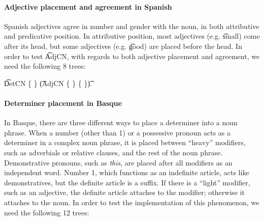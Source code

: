 

\paragraph{Adjective placement and agreement in Spanish}
Spanish adjectives agree in number and gender with the noun, in both
attributive and predicative position. In attributive position, most
adjectives (e.g. \t{small}) come after its head, but some adjectives
(e.g. \t{good}) are placed before the head. 
In order to test \t{AdjCN}, with regards to both adjective placement
and agreement, we need the following 8 trees: 
\begin{EmptyItem}
\t{DetCN} \; \{  \} \;
 \t{(AdjCN} \; \{  \} 
           \{  \}\t{)}.
\end{EmptyItem}

\paragraph{Determiner placement in Basque} In Basque, there are three
different ways to place a determiner into a noun phrase. When a number
(other than 1) or a possessive pronoun acts as a determiner in a
complex noun phrase, it is placed between ``heavy'' modifiers, such as
adverbials or relative clauses, and the rest of the noun phrase. 
Demonstrative pronouns, such as \emph{this}, are placed after
all modifiers as an independent word. Number 1, which functions as an
indefinite article, acts like demonstratives, but the definite article
is a suffix. If there is a ``light'' modifier, such as an adjective,
the definite article attaches to the modifier; otherwise it attaches
to the noun. 
In order to test the implementation of this phenomenon,
we need the following 12 trees: 

